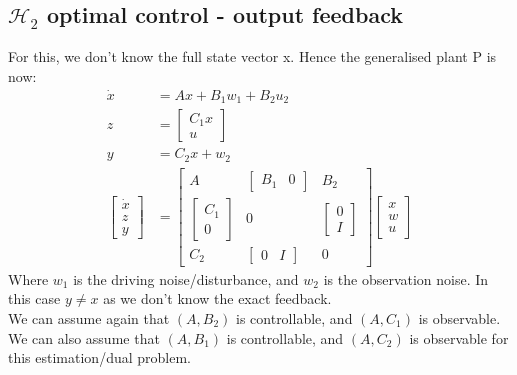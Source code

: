 \documentclass{article}
\begin{document}
\subsection{\texorpdfstring{$\mathcal{H}_2$}. optimal control - output feedback}
For this, we don't know the full state vector x. Hence the generalised plant P is now:
\[
\begin{aligned}
\dot x &= Ax + B_1 w_1 + B_2 u_2 \\
z &= \begin{bmatrix}
    C_1 x \\ u
\end{bmatrix} \\
y &= C_2 x + w_2 \\ 
\begin{bmatrix}
    \dot x \\ z \\ y
\end{bmatrix}
&= \begin{bmatrix}
    A & \begin{bmatrix}
        B_1 & 0
    \end{bmatrix}
    & 
    B_2 \\
    \begin{bmatrix}
        C_1 \\ 0
    \end{bmatrix}
    & 0 & \begin{bmatrix}
        0 \\ I
    \end{bmatrix} \\
    C_2 & \begin{bmatrix}
        0 & I
    \end{bmatrix}
    & 0
\end{bmatrix}
\begin{bmatrix}
    x \\ w \\ u
\end{bmatrix}
\end{aligned}
\]
Where $w_1$ is the driving noise/disturbance, and $w_2$ is the observation noise. In this case $y \neq x$ as we don't know the exact feedback. \\
We can assume again that $(A,B_2)$ is controllable, and $(A,C_1)$ is observable. We can also assume that $(A,B_1)$ is controllable, and $(A,C_2)$ is observable for this estimation/dual problem. 
\end{document}
